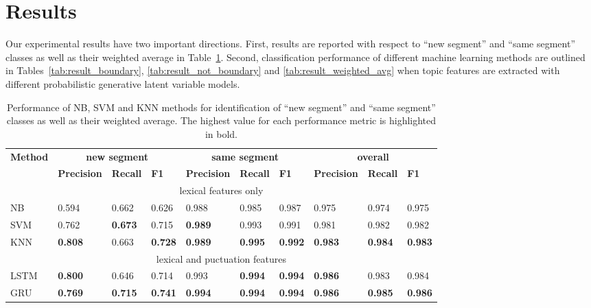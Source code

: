 \documentclass{amia}
\begin{document}
\section*{Results}
Our experimental results have two important directions. First, results are reported with respect to ``new segment'' and ``same segment'' classes as well as their weighted average in Table~\ref{tab:result_base}. Second, classification performance of different machine learning methods are outlined in Tables~\ref{tab:result_boundary}, \ref{tab:result_not_boundary} and \ref{tab:result_weighted_avg} when topic features are extracted with different probabilistic generative latent variable models.\\

\begin{table}[ht]
\centering
\caption{Performance of NB, SVM and KNN methods for identification of ``new segment'' and ``same segment'' classes as well as their weighted average. The highest value for each performance metric is highlighted in bold.}
\label{tab:result_base}
  \begin{tabular}{|l|l|l|l|l|l|l|l|l|l|}
  \hline
   \multirow{2}{*}{\textbf{Method}} & \multicolumn{3}{|c|}{\textbf{new segment}} & \multicolumn{3}{|c|}{\textbf{same segment}}  & \multicolumn{3}{|c|}{\textbf{overall}} \\\cline{2-10}
   & \textbf{Precision}  & \textbf{Recall} & \textbf{F1} & \textbf{Precision}  & \textbf{Recall} & \textbf{F1} & \textbf{Precision}  & \textbf{Recall} & \textbf{F1}\\ \hline    
 \multicolumn{10}{|c|}{lexical features only} \\ \hline   
 NB & 0.594 & 0.662 & 0.626 & 0.988 & 0.985 & 0.987 & 0.975 & 0.974 & 0.975  \\ \hline
 SVM & 0.762 & \textbf{0.673} & 0.715 & \textbf{0.989} & 0.993 & 0.991  & 0.981 & 0.982 & 0.982 \\ \hline
 KNN & \textbf{0.808} & 0.663 & \textbf{0.728} & \textbf{0.989} & \textbf{0.995} & \textbf{0.992} & \textbf{0.983} & \textbf{0.984} & \textbf{0.983} \\ \hline
 \multicolumn{10}{|c|}{lexical and puctuation features} \\ \hline
 LSTM & \textbf{0.800} & 0.646 & 0.714  & 0.993 & \textbf{0.994} & \textbf{0.994} & \textbf{0.986} & 0.983 & 0.984 \\ \hline
 GRU & \textbf{0.769} & \textbf{0.715} & \textbf{0.741} & \textbf{0.994} & \textbf{0.994} & \textbf{0.994} & \textbf{0.986} & \textbf{0.985} & \textbf{0.986} \\ \hline
  \end{tabular}
\end{table}                 
\end{document}
